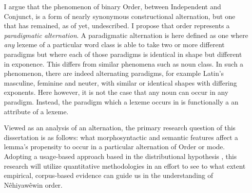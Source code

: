 I argue that the phenomenon of binary Order, between Independent and Conjunct, is a form of nearly synonymous constructional alternation, but one that has remained, as of yet, undescribed. I propose that order represents a \textit{paradigmatic alternation}. A paradigmatic alternation is here defined as one where \textit{any} lexeme of a particular word class is able to take two or more different paradigms but where each of those paradigms is identical in shape but different in exponence. This differs from similar phenomena such as noun class. In such a phenomenon, there are indeed alternating paradigms, for example Latin's masculine, feminine and neuter, with similar or identical shapes with differing exponents. Here however, it is not the case that any noun can occur in any paradigm. Instead, the paradigm which a lexeme occurs in is functionally a an attribute of a lexeme.

Viewed as an analysis of an alternation, the primary research question of this dissertation is as follows: what morphosyntactic and semantic features affect a lemma’s propensity to occur in a particular alternation of Order or mode. Adopting a usage-based approach based in the distributional hypothesis \citep{harris1954distributional, firth1957synopsis}, this research will utilize quantitative methodologies in an effort to see to what extent empirical, corpus-based evidence can guide us in the understanding of Nêhiyawêwin order.
